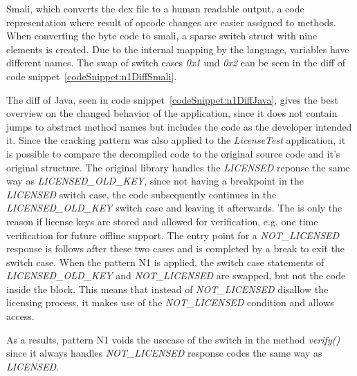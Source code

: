 Smali, which converts the \gls{dex} file to a human readable output, a code representation where result of opcode changes are easier assigned to methods.
When converting the byte code to smali, a sparse switch struct with nine elements is created.
Due to the internal mapping by the language, variables have different names.
The swap of switch cases \textit{0x1} und \textit{0x2} can be seen in the diff of code snippet~\ref{codeSnippet:n1DiffSmali}.
\newline


The diff of Java, seen in code snippet~\ref{codeSnippet:n1DiffJava}, gives the best overview on the changed behavior of the application, since it does not contain jumps to abstract method names but includes the code as the developer intended it.
Since the cracking pattern was also applied to the \textit{LicenseTest}
 application, it is possible to compare the decompiled code to the original source code and it's original structure.
The original library handles the \textit{LICENSED} reponse the same way as \textit{LICENSED\_OLD\_KEY}, since not having a breakpoint in the \textit{LICENSED} switch case, the code subsequently continues in the \textit{LICENSED\_OLD\_KEY} switch case and leaving it afterwards.
The is only the reason if license keys are stored and allowed for verification, e.g. one time verification for future offline support.
The entry point for a \textit{NOT\_LICENSED} response is follows after these two cases and is completed by a break to exit the switch case.
When the pattern N1 is applied, the switch case statements of \textit{LICENSED\_OLD\_KEY} and \textit{NOT\_LICENSED} are swapped, but not the code inside the block.
This means that instead of \textit{NOT\_LICENSED} disallow the licensing process, it makes use of the \textit{NOT\_LICENSED} condition and allows access.
\newline


As a results, pattern N1 voids the usecase of the switch in the method \textit{verify()} since it always handles \textit{NOT\_LICENSED} response codes the same way as \textit{LICENSED}.


